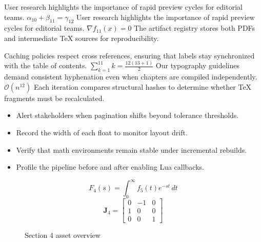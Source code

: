     User research highlights the importance of rapid preview cycles for editorial teams.  $\alpha_{10} + \beta_{11} = \gamma_{12}$  User research highlights the importance of rapid preview cycles for editorial teams.  $\nabla f_{11}(x) = 0$  The artifact registry stores both PDFs and intermediate TeX sources for reproducibility.
    \par
  
    Caching policies respect cross references, ensuring that labels stay synchronized with the table of contents.  $\sum_{k=1}^{11} k = \frac{12(13+1)}{2}$  Our typography guidelines demand consistent hyphenation even when chapters are compiled independently.  $\mathcal{O}(n^{12})$  Each iteration compares structural hashes to determine whether TeX fragments must be recalculated.
    \par
  
    \begin{itemize}
      
    \item Alert stakeholders when pagination shifts beyond tolerance thresholds.
    \item Record the width of each float to monitor layout drift.
    \item Verify that math environments remain stable under incremental rebuilds.
    \item Profile the pipeline before and after enabling Lua callbacks.
    \end{itemize}
\begin{equation}
\label{eq:sec4-eq1}
F_{4}(s) = \int_{0}^{\infty} f_{5}(t) e^{-st} \, dt
\end{equation}
\[
\mathbf{J}_{4} = \begin{bmatrix} 0 & -1 & 0 \\ 1 & 0 & 0 \\ 0 & 0 & 1 \end{bmatrix}
\]

    \begin{figure}[htbp]
      \centering
        \caption{Section 4 asset overview}
      
        \label{fig:fig-sec4}
      
    \end{figure}
  
